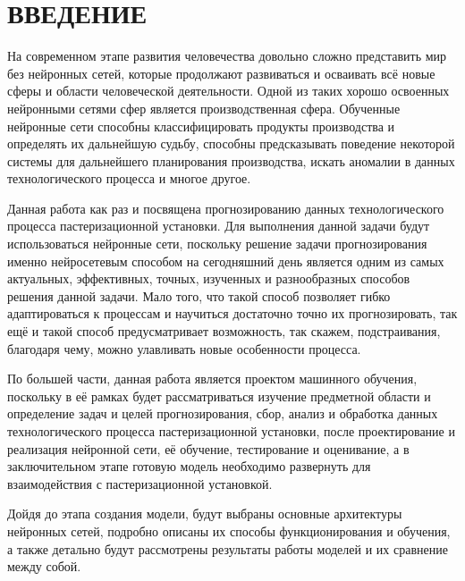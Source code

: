 \sectionbreak \section*{\redline \cyrillicfont \fontsize{14pt}{24pt}\selectfont 
    ВВЕДЕНИЕ
}
\titlespace

{\cyrillicfont %
\fontsize{13pt}{16.25pt}\selectfont %
\englishfont %

\par \redline На современном этапе развития человечества довольно сложно представить мир без нейронных сетей, которые продолжают развиваться и осваивать всё новые сферы и области человеческой деятельности. Одной из таких хорошо освоенных нейронными сетями сфер является производственная сфера. Обученные нейронные сети способны классифицировать продукты производства и определять их дальнейшую судьбу, способны предсказывать поведение некоторой системы для дальнейшего планирования производства, искать аномалии в данных технологического процесса и многое другое. 

\par \redline Данная работа как раз и посвящена прогнозированию данных технологического процесса пастеризационной установки. Для выполнения данной задачи будут использоваться нейронные сети, поскольку решение задачи прогнозирования именно нейросетевым способом на сегодняшний день является одним из самых актуальных, эффективных, точных, изученных и разнообразных способов решения данной задачи. Мало того, что такой способ позволяет гибко адаптироваться к процессам и научиться достаточно точно их прогнозировать, так ещё и такой способ предусматривает возможность, так скажем, подстраивания, благодаря чему, можно улавливать новые особенности процесса. 

\par \redline По большей части, данная работа является проектом машинного обучения, поскольку в её рамках будет рассматриваться изучение предметной области и определение задач и целей прогнозирования, сбор, анализ и обработка данных технологического процесса пастеризационной установки, после проектирование и реализация нейронной сети, её обучение, тестирование и оценивание, а в заключительном этапе готовую модель необходимо развернуть для взаимодействия с пастеризационной установкой.

\par \redline Дойдя до этапа создания модели, будут выбраны основные архитектуры нейронных сетей, подробно описаны их способы функционирования и обучения, а также детально будут рассмотрены результаты работы моделей и их сравнение между собой.

\par
}
